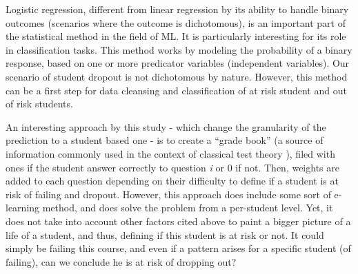 \documentclass[../../../main.tex]{subfiles}
\begin{document}
Logistic regression, different from linear regression by its ability to handle binary outcomes (scenarios where the outcome is dichotomous), is an important part of the statistical method in the field of ML. It is particularly interesting for its role in classification tasks. This method works by modeling the probability of a binary response, based on one or more predicator variables (independent variables). 
Our scenario of student dropout is not dichotomous by nature. However, this method can be a first step for data cleansing and classification of at risk student and out of risk students.

An interesting approach by this study \cite{lan_sparse_2014} - which change the granularity of the prediction to a student based one - is to create a “grade book” (a source of information commonly used in the context of classical test theory \cite{novick_axioms_1966}), filed with ones if the student answer correctly to question \textit{i} or 0 if not. Then, weights are added to each question depending on their difficulty to define if a student is at risk of failing and dropout. However, this approach does include some sort of e-learning method, and does solve the problem from a per-student level. Yet, it does not take into account other factors cited above to paint a bigger picture of a life of a student, and thus, defining if this student is at risk or not. It could simply be failing this course, and even if a pattern arises for a specific student (of failing), can we conclude he is at risk of dropping out?
\end{document}
